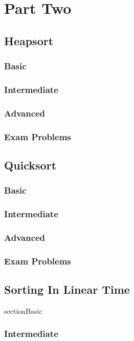 \documentclass[11pt,fleqn]{book}
\begin{document}

\part{Part Two}


\chapter{Heapsort}
\section{Basic}
\section{Intermediate}
\section{Advanced}
\section{Exam Problems}
\chapter{Quicksort}
\section{Basic}
\section{Intermediate}
\section{Advanced}
\section{Exam Problems}
\chapter{Sorting In Linear Time} 
section{Basic}
\section{Intermediate}
\end{document}
